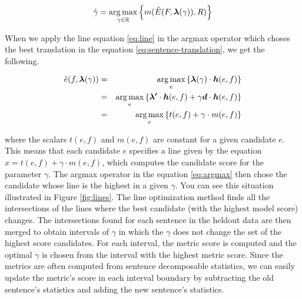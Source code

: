 \begin{equation}
  \hat{\gamma} = \operatorname*{arg\,max}_{\gamma \in \mathbb{R}} \left\{ m(\hat{E}(F,\boldsymbol{\lambda}(\gamma)),R) \right\}
    \label{eq:line-opt}
\end{equation}

When we apply the line equation \ref{eq:line} in the argmax operator which
choses the best translation in the equation \ref{eq:sentence-translation}, we
get the following.

\begin{eqnarray}
  \hat{e}(f, \boldsymbol{\lambda}(\gamma))
    & = & \operatorname*{arg\,max}_{e} \left\{ \boldsymbol{\lambda}(\gamma) \cdot  \boldsymbol{h}(e, f) \right\} \\
    & = & \operatorname*{arg\,max}_{e} \left\{ \boldsymbol{\lambda'} \cdot \boldsymbol{h}(e, f) + \gamma \boldsymbol{d} \cdot \boldsymbol{h}(e, f) \right\} \\
    & = & \operatorname*{arg\,max}_{e} \left\{ t(e,f) + \gamma \cdot m(e,f) \right\} \label{eq:argmax}
\end{eqnarray}

\noindent where the scalars $t(e,f)$ and $m(e,f)$ are constant for a given
candidate $e$. This means that each candidate $e$ specifies a line given by
the equation $x = t(e,f) + \gamma \cdot m(e,f)$, which computes the candidate
score for the parameter $\gamma$. The argmax operator in the equation
\eqref{eq:argmax} then chose the candidate whose line is the highest in a
given $\gamma$. You can see this situation illustrated in Figure
\ref{fig:lines}.  The line optimization method finds all the intersections of
the lines where the best candidate (with the highest model score) changes. The
intersections found for each sentence in the heldout data are then merged to
obtain intervals of $\gamma$ in which the $\gamma$ does not change the set of
the highest score candidates.  For each interval, the metric score is computed
and the optimal $\gamma$ is chosen from the interval with the highest metric
score. Since the metrics are often computed from sentence decomposable
statistics, we can easily update the metric's score in each interval boundary
by subtracting the old sentence's statistics and adding the new sentence's
statistics.

